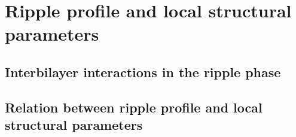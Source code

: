 \section{Ripple profile and local structural parameters}

\subsection{Interbilayer interactions in the ripple phase}

\subsection{Relation between ripple profile and local structural parameters}
